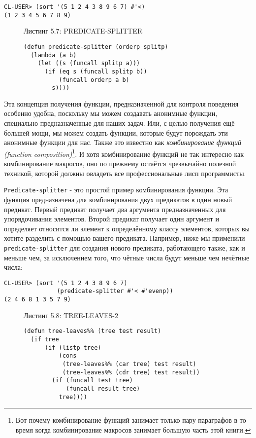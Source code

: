 \begin{verbatim}
CL-USER> (sort '(5 1 2 4 3 8 9 6 7) #'<)
(1 2 3 4 5 6 7 8 9)
\end{verbatim}

\begin{figure}Листинг 5.7: PREDICATE-SPLITTER\label{listing_5.7}
\listbegin
\begin{verbatim}
(defun predicate-splitter (orderp splitp)
  (lambda (a b)
    (let ((s (funcall splitp a)))
      (if (eq s (funcall splitp b))
          (funcall orderp a b)
        s))))
\end{verbatim}
\listend
\end{figure}

Эта концепция получения функции, предназначенной для контроля поведения особенно удобна, поскольку мы можем создавать анонимные функции, специально предназначенные для наших задач. Или, с целью получения ещё большей мощи, мы можем создать функции, которые будут порождать эти анонимные функции для нас. Также это известно как \emph{комбинирование функций (function composition)}\footnote{Вот почему комбинирование функций занимает только пару параграфов в то время когда комбинирование макросов занимает большую часть этой книги.}. И хотя комбинирование функций не так интересно как комбинирование макросов, оно по прежнему остаётся чрезвычайно полезной техникой, которой должны овладеть все профессиональные лисп программисты.



\verb"Predicate-splitter" - это простой пример комбинирования функции. Эта функция предназначена для комбинирования двух предикатов в один новый предикат. Первый предикат получает два аргумента предназначенных для упорядочивания элементов. Второй предикат получает один аргумент и определяет относится ли элемент к определённому классу элементов, которых вы хотите разделить с помощью вашего предиката. Например, ниже мы применили \verb"predicate-splitter" для создания нового предиката, работающего также, как и меньше чем, за исключением того, что чётные числа будут меньше чем нечётные числа:

\begin{verbatim}
CL-USER> (sort '(5 1 2 4 3 8 9 6 7)
               (predicate-splitter #'< #'evenp))
(2 4 6 8 1 3 5 7 9)
\end{verbatim}

\begin{figure}Листинг 5.8: TREE-LEAVES-2\label{listing_5.8}
\listbegin
\begin{verbatim}
(defun tree-leaves%% (tree test result)
  (if tree
      (if (listp tree)
          (cons
           (tree-leaves%% (car tree) test result)
           (tree-leaves%% (cdr tree) test result))
        (if (funcall test tree)
            (funcall result tree)
          tree))))
\end{verbatim}
\listend
\end{figure}

